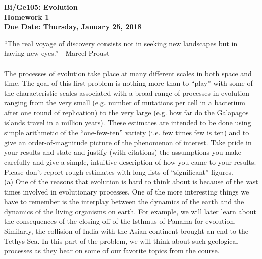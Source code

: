 \documentclass[12pt]{article}    %
\begin{document}
\relax


\begin{center}
{\bf\Large Bi/Ge105: Evolution}\\
{\bf\Large Homework 1}\\
{\bf\Large Due Date: Thursday, January 25, 2018}\\
\end{center}
 
``The real voyage of discovery consists not in seeking new
landscapes but in having new eyes.''  - Marcel Proust\\


\\

\noindent The processes of evolution take place at many different scales in
both space and time.  The goal of this first problem is nothing more than to ``play''
with some of the characteristic scales associated with a broad range of processes in
evolution ranging from the very small (e.g. number of mutations per cell in a bacterium
after one round of replication) to the very large (e.g. how far do the Galapagos islands travel
in a million years).  These estimates are intended to be done using simple arithmetic of
the ``one-few-ten'' variety (i.e. few times few is ten) and to give an order-of-magnitude 
picture of the phenomenon of interest.  Take pride in  your results and state and
justify (with citations) the assumptions you make carefully and give a simple, intuitive description of how you came
to your results.   Please don't report
rough estimates with long lists of ``significant'' figures.  \\




(a) One of the reasons that evolution is hard to think about is because of
the vast times involved in evolutionary processes.  One of the more interesting
things we have to remember is the interplay between the dynamics of the
earth and the dynamics of the living organisms on earth.  For example, we will later
learn about the consequences of the closing off of the Isthmus of Panama for
evolution.  Similarly, the collision of India with the Asian continent brought an
end to the Tethys Sea.  In this part of the problem, we will think about
such geological processes as they bear on some of our favorite topics from
the course.\\
\end{document}
